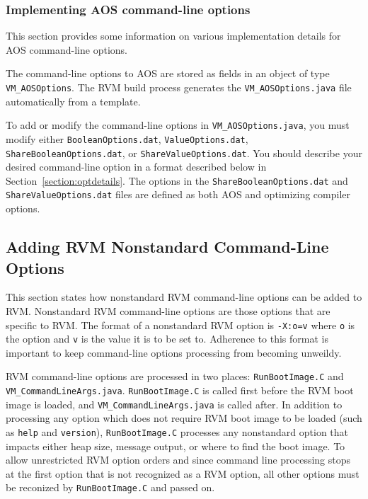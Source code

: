\subsubsection{Implementing AOS command-line options}

This section provides some information on various
implementation details for AOS command-line options.

The command-line options to AOS are
stored as fields in an object of type {\tt VM\_AOSOptions}.
The RVM build process generates the {\tt VM\_AOSOptions.java} 
file automatically from a template.  

To add or modify the command-line options in {\tt VM\_AOSOptions.java},
you must modify either {\tt BooleanOptions.dat}, {\tt ValueOptions.dat},
{\tt ShareBooleanOptions.dat}, or {\tt ShareValueOptions.dat}.
You should describe your desired command-line option in a format 
described below in Section~\ref{section:optdetails}.
The options in the {\tt ShareBooleanOptions.dat} and {\tt ShareValueOptions.dat}
files are defined as both AOS and optimizing compiler options.

\subsection{Adding RVM Nonstandard Command-Line Options}

This section states how nonstandard RVM command-line options can be added
to RVM.  
Nonstandard RVM command-line options are those options that are specific to RVM.
The format of a nonstandard RVM option is {\tt -X:o=v} where {\tt o} is the 
option and {\tt v} is the value it is to be set to.
Adherence to this format is important to keep command-line options processing
from becoming unweildy.

RVM command-line options are processed in two places: {\tt RunBootImage.C} and
{\tt VM\_CommandLineArgs.java}.  
{\tt RunBootImage.C} is called first before the RVM boot image is loaded,
and {\tt VM\_CommandLineArgs.java} is called after.
In addition to processing any option which does not require RVM boot image
to be loaded (such as {\tt help} and {\tt version}), 
{\tt RunBootImage.C} processes any nonstandard option that impacts either 
heap size, message output, or where to find the boot image.
To allow unrestricted RVM option orders and 
since command line processing stops at the first option that is not 
recognized as a RVM option, all other options must be reconized by
{\tt RunBootImage.C} and passed on.
